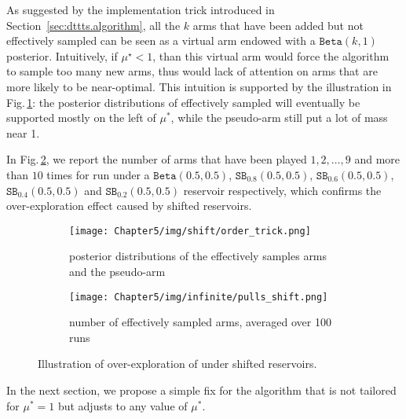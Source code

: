 As suggested by the implementation trick introduced in Section~\ref{sec:dttts.algorithm}, all the $k$ arms that have been added but not effectively sampled can be seen as a virtual arm endowed with a $\texttt{Beta}(k,1)$ posterior. Intuitively, if $\mu^\star < 1$, than this virtual arm would force the algorithm to sample too many new arms, thus would lack of attention on arms that are more likely to be near-optimal. This intuition is supported by the illustration in Fig.\,\ref{fig:shifted_reservoir}: the posterior distributions of effectively sampled will eventually be supported mostly on the left of $\mu^*$, while the pseudo-arm still put a lot of mass near 1. 

In Fig.\,\ref{fig:arms_shift}, we report the number of arms that have been played $1,2,\dots,9$ and more than $10$ times for \DTTTS run under a $\texttt{Beta}(0.5,0.5)$, $\texttt{SB}_{0.8}(0.5,0.5)$, $\texttt{SB}_{0.6}(0.5,0.5)$, $\texttt{SB}_{0.4}(0.5,0.5)$ and $\texttt{SB}_{0.2}(0.5,0.5)$ reservoir respectively, which confirms the over-exploration effect caused by shifted reservoirs.

\begin{figure}[ht]
  \centering
  \begin{subfigure}[t]{0.45\textwidth}
    \centering\texttt{[image: Chapter5/img/shift/order\_trick.png]}
    \caption{posterior distributions of the effectively samples arms and the pseudo-arm}
    \label{fig:shifted_reservoir}
  \end{subfigure}%
  \hspace{0.5cm}
  \begin{subfigure}[t]{0.45\textwidth}
    \centering\texttt{[image: Chapter5/img/infinite/pulls\_shift.png]}
    \caption{number of effectively sampled arms, averaged over 100 runs}
    \label{fig:arms_shift}
  \end{subfigure}%
  \caption{Illustration of over-exploration of \DTTTS under shifted reservoirs.}
  \label{fig:arms}
\end{figure}

In the next section, we propose a simple fix for the algorithm that is not tailored for $\mu^*=1$ but adjusts to any value of $\mu^*$.
